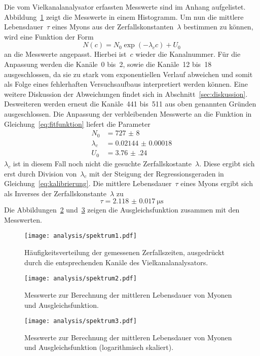 Die vom Vielkanalanalysator erfassten Messwerte sind im Anhang aufgelistet.
Abbildung~\ref{fig:spektrum1} zeigt die Messwerte in einem Histogramm. Um nun
die mittlere Lebensdauer~$\tau$ eines Myons aus der Zerfallskonstanten~$\lambda$
bestimmen zu können, wird eine Funktion der Form
%
\begin{equation}
  N(c)=N_0\exp\left(-\lambda_cc\right)+U_0
  \label{eq:fitfunktion}
\end{equation}
%
an die Messwerte angepasst. Hierbei ist~$c$ wieder die Kanalnummer. Für die
Anpassung werden die Kanäle~\num{0} bis~\num{2}, sowie die Kanäle~\num{12}
bis~\num{18} ausgeschlossen, da sie zu stark vom exponentiellen Verlauf
abweichen und somit als Folge eines fehlerhaften Versuchsaufbaus interpretiert
werden können. Eine weitere Diskussion der Abweichungen findet sich in
Abschnitt~\ref{sec:diskussion}. Desweiteren werden erneut die Kanäle~\num{441}
bis~\num{511} aus oben genannten Gründen ausgeschlossen. Die Anpassung der
verbleibenden Messwerte an die Funktion in Gleichung~\ref{eq:fitfunktion}
liefert die Parameter
%
\begin{align}
  N_0&=\num{727(8)} \\
  \lambda_c&=\num{0.02144(18)} \\
  U_0&=\num{3.76(24)}
  \label{eq:fitparameter}
\end{align}
%
$\lambda_c$ ist in diesem Fall noch nicht die gesuchte
Zerfallskostante~$\lambda$. Diese ergibt sich erst durch Division
von~$\lambda_c$ mit der Steigung der Regressionsgeraden in
Gleichung~\ref{eq:kalibrierung}. Die mittlere Lebensdauer~$\tau$ eines Myons
ergibt sich als Inverses der Zerfallskonstante~$\lambda$ zu
%
\begin{equation}
  \tau=\SI{2.118(17)}{\micro\second}
  \label{eq:ergebnis}
\end{equation}
%
Die Abbildungen~\ref{fig:spektrum2} und~\ref{fig:spektrum3} zeigen die
Ausgleichsfunktion zusammen mit den Messwerten.

\begin{figure}[htb]
  \centering
  \texttt{[image: analysis/spektrum1.pdf]}
  \caption{Häufigkeitsverteilung der gemessenen Zerfallszeiten, ausgedrückt
  durch die entsprechenden Kanäle des Vielkanalanalysators.}
  \label{fig:spektrum1}
\end{figure}

\begin{figure}[htb]
  \centering
  \texttt{[image: analysis/spektrum2.pdf]}
  \caption{Messwerte zur Berechnung der mittleren Lebensdauer von Myonen und
  Ausgleichsfunktion.}
  \label{fig:spektrum2}
\end{figure}

\begin{figure}[htb]
  \centering
  \texttt{[image: analysis/spektrum3.pdf]}
  \caption{Messwerte zur Berechnung der mittleren Lebensdauer von Myonen und
  Ausgleichsfunktion (logarithmisch skaliert).}
  \label{fig:spektrum3}
\end{figure}
